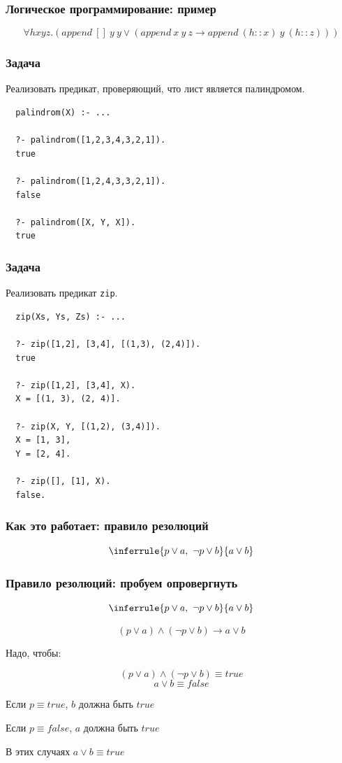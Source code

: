 \documentclass{beamer}
\begin{document}
\begin{frame}[fragile]
  \frametitle{Логическое программирование: пример}
\[
  \forall h x y z. (append \ [] \ y \ y \vee (append \ x \ y \ z \to append \ (h :: x) \  y \ (h :: z)))
\]
\end{frame}

\begin{frame}[fragile]
  \frametitle{Задача}
Реализовать предикат, проверяющий, что лист является палиндромом.

\begin{verbatim}
  palindrom(X) :- ...

  ?- palindrom([1,2,3,4,3,2,1]).
  true

  ?- palindrom([1,2,4,3,3,2,1]).
  false

  ?- palindrom([X, Y, X]).
  true
\end{verbatim}
\end{frame}

\begin{frame}[fragile]
  \frametitle{Задача}
Реализовать предикат \verb!zip!.

\begin{verbatim}
  zip(Xs, Ys, Zs) :- ...

  ?- zip([1,2], [3,4], [(1,3), (2,4)]).
  true

  ?- zip([1,2], [3,4], X).
  X = [(1, 3), (2, 4)].

  ?- zip(X, Y, [(1,2), (3,4)]).
  X = [1, 3],
  Y = [2, 4].

  ?- zip([], [1], X).
  false.
\end{verbatim}
\end{frame}


\begin{frame}[fragile]
  \frametitle{Как это работает: правило резолюций}
\[\inferrule{p \vee a, \ \neg p \vee b}{a \vee b}\]
\end{frame}

\begin{frame}[fragile]
  \frametitle{Правило резолюций: пробуем опровергнуть}
  \[\inferrule{p \vee a, \ \neg p \vee b}{a \vee b}\]

\[
  (p \vee a) \wedge (\neg p \vee b) \to a \vee b
\]
\begin{center}
Надо, чтобы:
\end{center}
\[
  (p \vee a) \wedge (\neg p \vee b) \equiv true
\]
\[
  a \vee b \equiv false
\]


\begin{center}
  Если $p \equiv true$, $b$ должна быть $true$

  Если $p \equiv false$, $a$ должна быть $true$

  В этих случаях $a \vee b \equiv true$
\end{center}

\end{frame}
\end{document}
